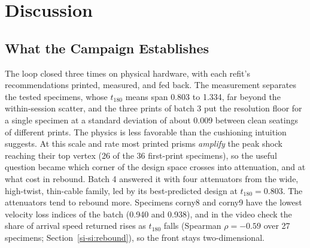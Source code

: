 \documentclass[lineno,nocopyright,upint,varvw,hyphenate]{asmejour}
\newcommand{\siref}[1]{\ref*{si-#1}}
\begin{document}
\section{Discussion}
\label{sec:discussion}

\subsection{What the Campaign Establishes}
The loop closed three times on physical hardware, with each refit's
recommendations printed, measured, and fed back. The measurement
separates the tested specimens, whose $t_{180}$ means span 0.803 to
1.334, far beyond the within-session scatter, and the three prints of
batch 3 put the resolution floor for a single specimen at a standard
deviation of about 0.009 between clean seatings of different prints. The
physics is less favorable than the cushioning intuition suggests. At this
scale and rate most printed prisms \emph{amplify} the peak shock reaching
their top vertex (26 of the 36 first-print specimens), so the useful question became
which corner of the design space crosses into attenuation, and at what
cost in rebound. Batch 4 answered it with four attenuators from the wide,
high-twist, thin-cable family, led by its best-predicted design at
$t_{180} = 0.803$. The attenuators tend to rebound more. Specimens corny8 and
corny9 have the lowest velocity loss indices of the batch (0.940 and
0.938), and in the video check the share of arrival speed returned rises
as $t_{180}$ falls (Spearman $\rho = -0.59$ over 27 specimens;
Section~\siref{si:rebound}), so the front stays two-dimensional.
\end{document}
